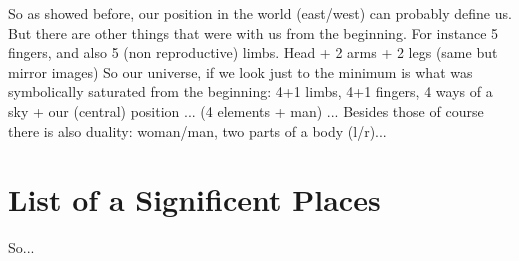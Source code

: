 \documentclass[10pt]{book}
\begin{document}
So as showed before, our position in the world (east/west) can probably define us. But there are other things that were with us from the beginning. For instance 5 fingers, and also 5 (non reproductive) limbs. Head + 2 arms + 2 legs (same but mirror images)
So our universe, if we look just to the minimum is what was symbolically saturated from the beginning: 4+1 limbs, 4+1 fingers, 4 ways of a sky + our (central) position ... (4 elements + man) ... Besides those of course there is also duality: woman/man, two parts of a body (l/r)...

\chapter{List of a Significent Places}

So...
\end{document}
